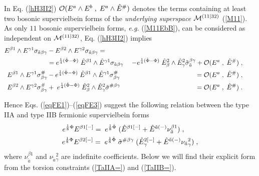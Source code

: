 \documentclass[a4paper,11pt]{article}
\begin{document}
In Eq. (\ref{hH3II2}) ${\cal O} (
{E}^{ {a}}\wedge {E}^{ {b}}\; ,\;  
{E}^{ {a}}\wedge \hat{E}^{ {\#}})$ denotes the terms 
containing at least two bosonic supervielbein forms 
of 
the {\sl underlying superspace} 
${\cal M}^{(11|32)}$ (\ref{M11}).  
As only $11$ bosonic supervielbein forms, 
{\it e.g.} (\ref{M11EbB}), can be considered as 
independent on ${\cal M}^{(11|32)}$, Eq. (\ref{hH3II2}) implies 
\begin{eqnarray}\label{eqFE1}
{E}^{ {\beta}1}\wedge {E}^{ {\gamma}1} 
\sigma_{  {\tilde{a}} {\beta} {\gamma}} 
 & -   {E}^{ {\beta}2}\wedge {E}^{ {\gamma}2} 
\sigma_{  {\tilde{a}} {\beta} {\gamma}} 
= & \\ \nonumber  
& =  e^{{1\over 4}(\hat{\Phi}- {\Phi})} \; 
\hat{E}^{ {\beta}1}\wedge \hat{E}^{ {\gamma}1} 
\sigma_{  {\tilde{a}} {\beta} {\gamma}} \; 
  & -    e^{{1\over 4}(\hat{\Phi}- {\Phi})} \;
\hat{E}_{ {\beta}}^2\wedge \hat{E}_{ {\gamma}}^2  
\tilde{\sigma}_{ {\tilde{a}}}
^{ {\beta} {\gamma}}  + 
{\cal O} ({E}^{ {a}}\; ,\; \hat{E}^{ {\#}})\; , \qquad  
\\ \label{eqFE2} 
{E}^{ {\beta}1}\wedge {E}^{ {\gamma}1} 
\sigma^{  {\#}}_{ {\beta} {\gamma}} 
 & -   e^{{1\over 4}(\hat{\Phi}- {\Phi})}\; 
\hat{E}^{ {\beta}1}\wedge \hat{E}^{ {\gamma}1} 
\sigma^{  {\#}}_{ {\beta} {\gamma}}
 & =  {\cal O} (
{E}^{ {a}}\; ,\;  \hat{E}^{ {\#}})
\; , \qquad  
\\ \label{eqFE3} 
 \; {E}^{ {\beta}2}\wedge {E}^{ {\gamma}2} 
\sigma^{  {\#}}_{ {\beta} {\gamma}} 
& +  \;  e^{{1\over 4}(\hat{\Phi}- {\Phi})} \;
\hat{E}_{ {\beta}}^2\wedge \hat{E}_{ {\gamma}}^2  
\tilde{\sigma}^{ {\#} {\beta} {\gamma}} 
 & = {\cal O} (
{E}^{ {a}}\; ,\;  \hat{E}^{ {\#}})\; . \qquad 
\end{eqnarray}


Hence Eqs. (\ref{eqFE1})--(\ref{eqFE3}) suggest the 
following relation between the type IIA and type IIB 
fermionic supervielbein forms  
\begin{eqnarray}\label{Td-EhE10}
e^{{1\over 8}{\Phi}}
{E}^{ {\beta}1[-]} = \;  e^{{1\over 8}\hat{\Phi}}
\; 
(\hat{E}^{{\beta}1[-]} + 
\hat{E}^{ {\tilde{a}}(-)} 
\nu^{ {\beta}1}_{ {\tilde{a}}}) 
\; , \qquad \\  
\label{Td-EhE20}
e^{{1\over 8}{\Phi}} {E}^{ {\beta}2[-]}= \; 
e^{{1\over 8}\hat{\Phi}}
\;  
\tilde{\sigma}^{ {\#} {\beta} {\gamma}}
\; ( \hat{E}_{{\gamma}}^{2[-]}  + 
\hat{E}^{ {\tilde{a}}(-)}
\nu_{ {\tilde{a}}}{}^2_{ {\gamma}})
\; ,  
\end{eqnarray}
where $\nu^{ {\beta}1}_{ {\tilde{a}}}$ and 
$\nu_{ {\tilde{a}}}{}^2_{ {\gamma}}$ are 
indefinite coefficients. 
Below we will find their 
explicit form from the torsion constraints 
(\ref{TaIIA=}) and (\ref{TaIIB=}). 
\end{document}
